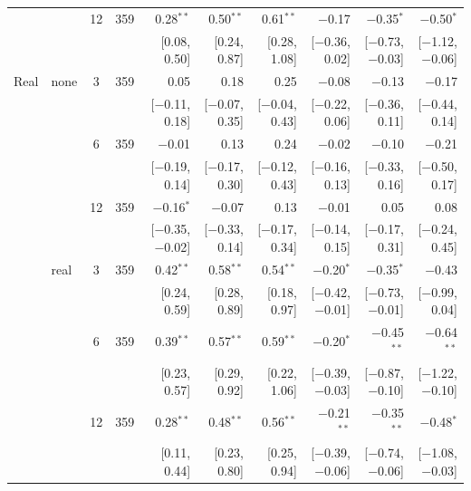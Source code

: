 \begin{longtable}{llcrrrrrrr}
 &  & 12 & 359 & 0.28$^{**}$ & 0.50$^{**}$ & 0.61$^{**}$ & $-$0.17 & $-$0.35$^{*}$ & $-$0.50$^{*}$\\
 & & & & {\scriptsize [0.08, 0.50]} & {\scriptsize [0.24, 0.87]} & {\scriptsize [0.28, 1.08]} & {\scriptsize [$-$0.36, 0.02]} & {\scriptsize [$-$0.73, $-$0.03]} & {\scriptsize [$-$1.12, $-$0.06]}\\
\addlinespace
Real & none & 3 & 359 & 0.05 & 0.18 & 0.25 & $-$0.08 & $-$0.13 & $-$0.17\\
 & & & & {\scriptsize [$-$0.11, 0.18]} & {\scriptsize [$-$0.07, 0.35]} & {\scriptsize [$-$0.04, 0.43]} & {\scriptsize [$-$0.22, 0.06]} & {\scriptsize [$-$0.36, 0.11]} & {\scriptsize [$-$0.44, 0.14]}\\
 &  & 6 & 359 & $-$0.01 & 0.13 & 0.24 & $-$0.02 & $-$0.10 & $-$0.21\\
 & & & & {\scriptsize [$-$0.19, 0.14]} & {\scriptsize [$-$0.17, 0.30]} & {\scriptsize [$-$0.12, 0.43]} & {\scriptsize [$-$0.16, 0.13]} & {\scriptsize [$-$0.33, 0.16]} & {\scriptsize [$-$0.50, 0.17]}\\
 &  & 12 & 359 & $-$0.16$^{*}$ & $-$0.07 & 0.13 & $-$0.01 & 0.05 & 0.08\\
 & & & & {\scriptsize [$-$0.35, $-$0.02]} & {\scriptsize [$-$0.33, 0.14]} & {\scriptsize [$-$0.17, 0.34]} & {\scriptsize [$-$0.14, 0.15]} & {\scriptsize [$-$0.17, 0.31]} & {\scriptsize [$-$0.24, 0.45]}\\
 & real & 3 & 359 & 0.42$^{**}$ & 0.58$^{**}$ & 0.54$^{**}$ & $-$0.20$^{*}$ & $-$0.35$^{*}$ & $-$0.43\\
 & & & & {\scriptsize [0.24, 0.59]} & {\scriptsize [0.28, 0.89]} & {\scriptsize [0.18, 0.97]} & {\scriptsize [$-$0.42, $-$0.01]} & {\scriptsize [$-$0.73, $-$0.01]} & {\scriptsize [$-$0.99, 0.04]}\\
 &  & 6 & 359 & 0.39$^{**}$ & 0.57$^{**}$ & 0.59$^{**}$ & $-$0.20$^{*}$ & $-$0.45$^{**}$ & $-$0.64$^{**}$\\
 & & & & {\scriptsize [0.23, 0.57]} & {\scriptsize [0.29, 0.92]} & {\scriptsize [0.22, 1.06]} & {\scriptsize [$-$0.39, $-$0.03]} & {\scriptsize [$-$0.87, $-$0.10]} & {\scriptsize [$-$1.22, $-$0.10]}\\
 &  & 12 & 359 & 0.28$^{**}$ & 0.48$^{**}$ & 0.56$^{**}$ & $-$0.21$^{**}$ & $-$0.35$^{**}$ & $-$0.48$^{*}$\\
 & & & & {\scriptsize [0.11, 0.44]} & {\scriptsize [0.23, 0.80]} & {\scriptsize [0.25, 0.94]} & {\scriptsize [$-$0.39, $-$0.06]} & {\scriptsize [$-$0.74, $-$0.06]} & {\scriptsize [$-$1.08, $-$0.03]}\\

\end{longtable}
